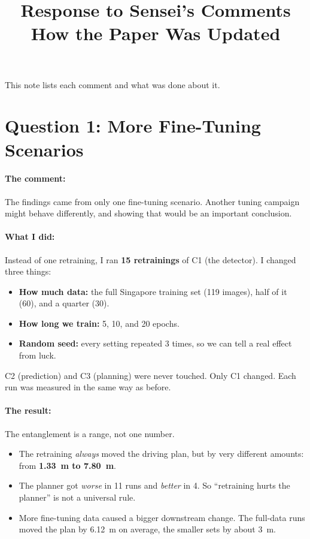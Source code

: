 \documentclass[11pt,a4paper]{article}
\title{\vspace{-2em}Response to Sensei's Comments\\
\large How the Paper Was Updated}
\date{}
\begin{document}
\maketitle
\vspace{-3em}

\noindent
This note lists each comment and what was done about it.

\section{Question 1: More Fine-Tuning Scenarios}

\paragraph{The comment:} The findings came from only one fine-tuning scenario.
Another tuning campaign might behave differently, and showing that would be an
important conclusion.

\paragraph{What I did:} Instead of one retraining, I ran \textbf{15 retrainings}
of C1 (the detector). I changed three things:

\begin{itemize}[noitemsep]
    \item \textbf{How much data:} the full Singapore training set (119 images),
          half of it (60), and a quarter (30).
    \item \textbf{How long we train:} 5, 10, and 20 epochs.
    \item \textbf{Random seed:} every setting repeated 3 times, so we can tell a
          real effect from luck.
\end{itemize}

C2 (prediction) and C3 (planning) were never touched. Only C1 changed. Each run
was measured in the same way as before.

\paragraph{The result:} The entanglement is a range, not one number.

\begin{itemize}[noitemsep]
    \item The retraining \emph{always} moved the driving plan, but by very
          different amounts: from \textbf{1.33~m to 7.80~m}.
    \item The planner got \emph{worse} in 11 runs and \emph{better} in 4.
          So ``retraining hurts the planner'' is not a universal rule.
    \item More fine-tuning data caused a bigger downstream change. The full-data
          runs moved the plan by 6.12~m on average, the smaller sets by about
          3~m.
\end{itemize}
\end{document}
